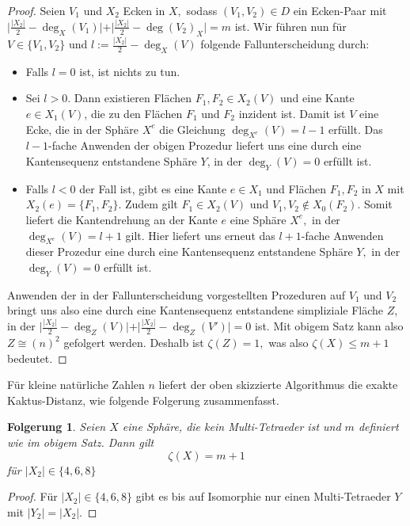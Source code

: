 \documentclass[12pt,titlepage,twoside,cleardoublepage]{article}
\theoremstyle{nummermitklammern}
\newtheorem{folgerung}[temp]{Folgerung}
\newtheorem{folgerung}[zahl]{Folgerung}
\numberwithin{equation}{section}
\begin{document}
\begin{proof}
Seien $V_1$ und $X_2$ Ecken in $X,$ sodass $(V_1,V_2)\in D$ ein Ecken-Paar mit 
$\vert\frac{\vert X_2 \vert}{2}-\deg_X(V_1)\vert +\vert \frac{\vert X_2 \vert}{2}-\deg(V_2)_X\vert=m$ ist.
Wir führen nun für $V \in \{V_1,V_2\}$ und $l:=\frac{\vert X_2 \vert}{2}-\deg_X(V)$ folgende Fallunterscheidung durch:
\begin{itemize}
\item Falls $l=0$ ist, ist nichts zu tun.
\item Sei $l>0$. Dann existieren Flächen $F_1,F_2 \in X_2(V)$ und eine Kante $e\in X_1(V)$, die zu den Flächen $F_1$ und $F_2$ inzident ist. Damit ist $V$ eine Ecke, die in der Sphäre $X^e$ die Gleichung $\deg_{X^e}(V)=l-1$ erfüllt. Das $l-1$-fache Anwenden der obigen Prozedur liefert uns eine durch eine Kantensequenz entstandene Sphäre $Y$, in der  $\deg_Y(V)=0$ erfüllt ist. 
 \item Falls $l<0$ der Fall ist, gibt es eine Kante $e\in X_1$ und Flächen $F_1,F_2$ in $X$ mit $X_2(e)=\{F_1,F_2\}$. Zudem gilt $F_1\in X_2(V)$ und $V_1,V_2 \notin X_0(F_2)$. Somit liefert die Kantendrehung an der Kante $e$ eine Sphäre $X^e,$ in der $\deg_{X^e}(V)=l+1$ gilt. Hier liefert uns erneut das $l+1$-fache Anwenden dieser Prozedur eine durch eine Kantensequenz entstandene Sphäre $Y,$ in der  $\deg_Y(V)=0$ erfüllt ist.
\end{itemize}  
 Anwenden der in der Fallunterscheidung vorgestellten Prozeduren auf $V_1$ und $V_2$ bringt uns also eine durch eine Kantensequenz entstandene simpliziale Fläche $Z$, in der $\vert\frac{\vert X_2 \vert}{2}-\deg_Z(V)\vert +\vert \frac{\vert X_2 \vert}{2}-\deg_Z(V')\vert=0$ ist. Mit obigem Satz kann also $Z\cong (n)^2$ gefolgert werden. Deshalb ist $\zeta(Z)=1,$ was also $\zeta(X)\leq m+1$ bedeutet. 
\end{proof}

Für kleine natürliche Zahlen $n$ liefert der oben skizzierte Algorithmus die exakte Kaktus-Distanz, wie folgende Folgerung zusammenfasst. 
\begin{folgerung}
Seien $X$ eine Sphäre, die kein Multi-Tetraeder ist und $m$ definiert wie im obigem Satz. Dann gilt 
\[
\zeta(X)= m+1
\]
 für $\vert X_2 \vert \in \{4,6,8\}$ 
\end{folgerung}
\begin{proof}
Für $\vert X_2 \vert \in \{4,6,8\}$ gibt es bis auf Isomorphie nur einen Multi-Tetraeder $Y$ mit $\vert Y_2\vert=\vert X_2\vert.$
\end{proof}
\end{document}
